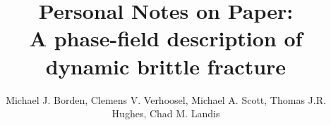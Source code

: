 \documentclass[12pt,3p]{article}
\numberwithin{equation}{section}
\begin{document}
\title{Personal Notes on Paper: \\
	\large{A phase-field description of dynamic brittle fracture}}
\author{Michael J. Borden, Clemens V. Verhoosel, Michael A. Scott, Thomas J.R. Hughes, Chad M. Landis}
\date{\vspace{-5ex}}
\maketitle

\tableofcontents
\newpage

\end{document}
